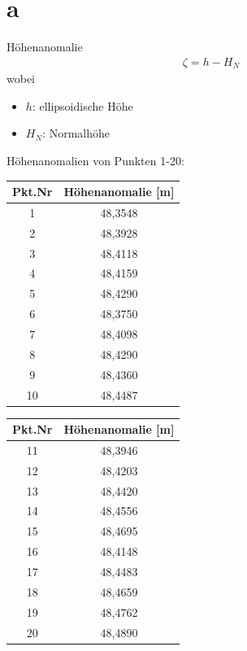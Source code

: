 \documentclass[12pt
,headinclude
,headsepline
,bibtotocnumbered
]{scrartcl}
\begin{document}
	\section{a}
	Höhenanomalie
	\begin{align*}
		\zeta=h-H_N
	\end{align*}
wobei
\begin{itemize}
	\item $h$: ellipsoidische Höhe
	\item $H_N$: Normalhöhe
\end{itemize}
Höhenanomalien von Punkten 1-20:
\begin{table}[ht] \centering
	\begin{tabular}{|c|c|}
		\hline
		Pkt.Nr & Höhenanomalie [m] \\ \hline
		1     & 48,3548       \\ \hline
		2     & 48,3928       \\ \hline
		3     & 48,4118       \\ \hline
		4     & 48,4159       \\ \hline
		5     & 48,4290       \\ \hline
		6     & 48,3750       \\ \hline
		7     & 48,4098       \\ \hline
		8     & 48,4290       \\ \hline
		9     & 48,4360       \\ \hline
		10    & 48,4487       \\ \hline
	\end{tabular}
	\begin{tabular}{|c|c|}
		\hline
		Pkt.Nr & Höhenanomalie [m] \\ \hline
		11    & 48,3946       \\ \hline
		12    & 48,4203       \\ \hline
		13    & 48,4420      \\ \hline
		14    & 48,4556       \\ \hline
		15    & 48,4695      \\ \hline
		16    & 48,4148       \\ \hline
		17    & 48,4483       \\ \hline
		18    & 48,4659       \\ \hline
		19    & 48,4762       \\ \hline
		20    & 48,4890       \\ \hline
	\end{tabular}
\end{table}\\
\end{document}
